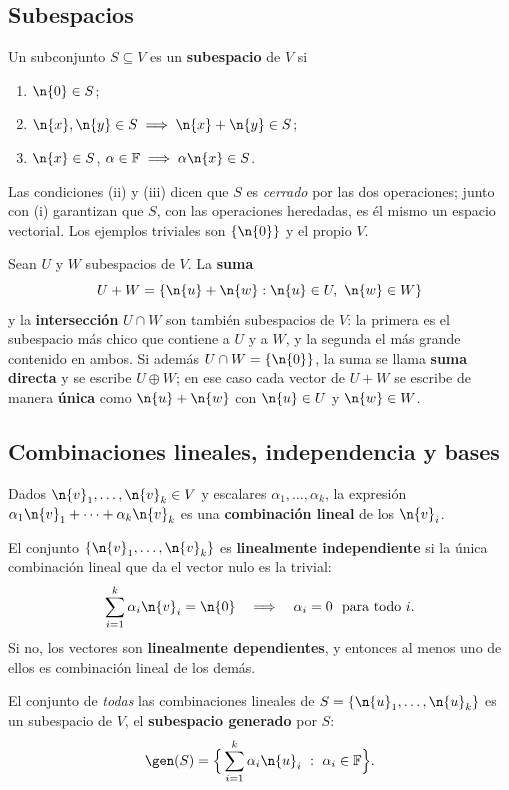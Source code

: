 \subsection{Subespacios}

Un subconjunto $S\subseteq V$ es un \textbf{subespacio} de $V$ si
\begin{enumerate}[itemsep=1pt,label=(\roman*)]
    \item $\n{0}\in S$;
    \item $\n{x},\n{y}\in S\implies \n{x}+\n{y}\in S$;
    \item $\n{x}\in S$, $\alpha\in\mathbb{F}\implies \alpha\n{x}\in S$.
\end{enumerate}
Las condiciones (ii) y (iii) dicen que $S$ es \emph{cerrado} por las dos
operaciones; junto con (i) garantizan que $S$, con las operaciones heredadas, es
él mismo un espacio vectorial. Los ejemplos triviales son $\{\n{0}\}$ y el
propio $V$.

Sean $U$ y $W$ subespacios de $V$. La \textbf{suma}
\[
U + W = \{\n{u} + \n{w} : \n{u} \in U,\ \n{w} \in W\}
\]
y la \textbf{intersección} $U\cap W$ son también subespacios de $V$: la primera
es el subespacio más chico que contiene a $U$ y a $W$, y la segunda el más
grande contenido en ambos. Si además $U \cap W = \{\n{0}\}$, la suma se llama
\textbf{suma directa} y se escribe $U \oplus W$; en ese caso cada vector de
$U+W$ se escribe de manera \textbf{única} como $\n{u} + \n{w}$ con $\n{u} \in U$
y $\n{w} \in W$.

\subsection{Combinaciones lineales, independencia y bases}

Dados $\n{v}_1, \dots, \n{v}_k \in V$ y escalares $\alpha_1, \dots, \alpha_k$,
la expresión $\alpha_1 \n{v}_1 + \cdots + \alpha_k \n{v}_k$ es una
\textbf{combinación lineal} de los $\n{v}_i$.

El conjunto $\{\n{v}_1, \dots, \n{v}_k\}$ es \textbf{linealmente independiente}
si la única combinación lineal que da el vector nulo es la trivial:
\[
\sum_{i=1}^k \alpha_i \n{v}_i = \n{0}
\quad \Longrightarrow \quad \alpha_i = 0 \ \text{ para todo } i.
\]
Si no, los vectores son \textbf{linealmente dependientes}, y entonces al menos
uno de ellos es combinación lineal de los demás.

El conjunto de \emph{todas} las combinaciones lineales de
$S = \{\n{u}_1, \dots, \n{u}_k\}$ es un subespacio de $V$, el \textbf{subespacio
generado} por $S$:
\[
\gen(S) = \Big\{ \sum_{i=1}^k \alpha_i \n{u}_i \ :\ \alpha_i \in \mathbb{F} \Big\}.
\]

